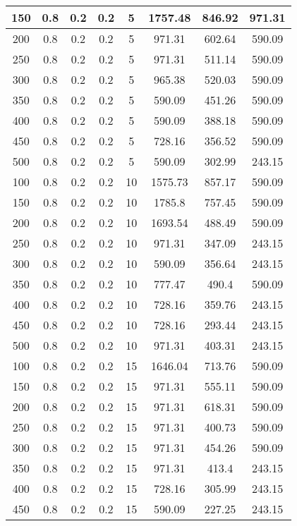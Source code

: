 \documentclass[a4paper, 12pt]{extreport}
\begin{document}
\begin{itemize}
\begin{longtable}{|c|c|c|c|c|c|c|c|}
			150 & 0.8 & 0.2 & 0.2 & 5 & 1757.48 & 846.92 & 971.31 \\\hline
			200 & 0.8 & 0.2 & 0.2 & 5 & 971.31 & 602.64 & 590.09 \\\hline
			250 & 0.8 & 0.2 & 0.2 & 5 & 971.31 & 511.14 & 590.09 \\\hline
			300 & 0.8 & 0.2 & 0.2 & 5 & 965.38 & 520.03 & 590.09 \\\hline
			350 & 0.8 & 0.2 & 0.2 & 5 & 590.09 & 451.26 & 590.09 \\\hline
			400 & 0.8 & 0.2 & 0.2 & 5 & 590.09 & 388.18 & 590.09 \\\hline
			450 & 0.8 & 0.2 & 0.2 & 5 & 728.16 & 356.52 & 590.09 \\\hline
			500 & 0.8 & 0.2 & 0.2 & 5 & 590.09 & 302.99 & 243.15 \\\hline
			100 & 0.8 & 0.2 & 0.2 & 10 & 1575.73 & 857.17 & 590.09 \\\hline
			150 & 0.8 & 0.2 & 0.2 & 10 & 1785.8 & 757.45 & 590.09 \\\hline
			200 & 0.8 & 0.2 & 0.2 & 10 & 1693.54 & 488.49 & 590.09 \\\hline
			250 & 0.8 & 0.2 & 0.2 & 10 & 971.31 & 347.09 & 243.15 \\\hline
			300 & 0.8 & 0.2 & 0.2 & 10 & 590.09 & 356.64 & 243.15 \\\hline
			350 & 0.8 & 0.2 & 0.2 & 10 & 777.47 & 490.4 & 590.09 \\\hline
			400 & 0.8 & 0.2 & 0.2 & 10 & 728.16 & 359.76 & 243.15 \\\hline
			450 & 0.8 & 0.2 & 0.2 & 10 & 728.16 & 293.44 & 243.15 \\\hline
			500 & 0.8 & 0.2 & 0.2 & 10 & 971.31 & 403.31 & 243.15 \\\hline
			100 & 0.8 & 0.2 & 0.2 & 15 & 1646.04 & 713.76 & 590.09 \\\hline
			150 & 0.8 & 0.2 & 0.2 & 15 & 971.31 & 555.11 & 590.09 \\\hline
			200 & 0.8 & 0.2 & 0.2 & 15 & 971.31 & 618.31 & 590.09 \\\hline
			250 & 0.8 & 0.2 & 0.2 & 15 & 971.31 & 400.73 & 590.09 \\\hline
			300 & 0.8 & 0.2 & 0.2 & 15 & 971.31 & 454.26 & 590.09 \\\hline
			350 & 0.8 & 0.2 & 0.2 & 15 & 971.31 & 413.4 & 243.15 \\\hline
			400 & 0.8 & 0.2 & 0.2 & 15 & 728.16 & 305.99 & 243.15 \\\hline
			450 & 0.8 & 0.2 & 0.2 & 15 & 590.09 & 227.25 & 243.15 \\\hline

\end{longtable}
\end{itemize}
\end{document}
